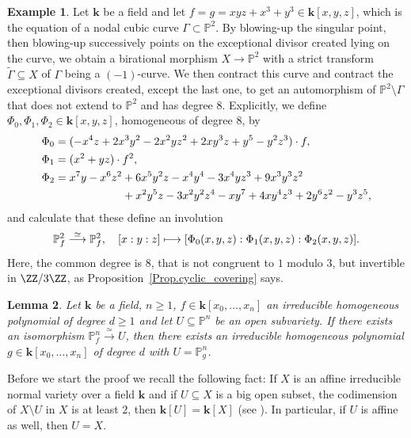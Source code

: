 \documentclass[JEP,XML,SOM,Unicode,NoFloatCountersInSection,published]{cedram}
\newcommand\mto{\mathchoice{\longmapsto}{\mapsto}{\mapsto}{\mapsto}}
\newtheorem{lemma}{Lemma}[section]
\theoremstyle{definition}
\newtheorem{example}[lemma]{Example}
\newcommand\iso{\stackrel{\simeq}{\longrightarrow}}
\renewcommand\k{{\mathbf k}}
\newcommand\p{{\mathbb P}}\let\PP\p
\newcommand{\kk}{\mathbf{k}}
\begin{document}
\begin{example}
Let $\k$ be a field and let $f=g=xyz+x^3+y^3\in \k[x,y,z]$, which is the equation of a nodal cubic curve $\Gamma\subset\p^2$. By blowing-up the singular point, then blowing-up successively points on the exceptional divisor created lying on the curve, we obtain a birational morphism $X\to\p^2$ with a strict transform $\tilde{\Gamma}\subseteq X$
of $\Gamma$ being a $(-1)$-curve. We then contract this curve and contract the exceptional divisors created, except the last one, to get an automorphism of $\p^2\setminus \Gamma$ that does not extend to $\p^2$ and has degree $8$. Explicitly, we define $\Phi_0,\Phi_1,\Phi_2\in \k[x,y,z]$, homogeneous of degree $8$, by
\begin{align*}
\Phi_0 & = (-x^4z + 2x^3y^2 - 2x^2yz^2 + 2xy^3z + y^5 - y^2z^3)\cdot f, \\
\Phi_1 & = (x^2+yz)\cdot f^2, \\
\Phi_2 &=
x^7 y -x^6 z^2+6 x^5 y^2z-x^4 y^4-3 x^4 yz^3 +9 x^3 y^3z^2 \\
&\hspace*{2.14cm} + x^2y^5 z-3 x^2 y^2z^4 - x y^7+4 x y^4z^3 +2 y^6z^2- y^3z^5,
\end{align*}
and calculate that these define an involution
\[
\p^2_f\iso \p^2_f, \quad [x:y:z]\mto [\Phi_0(x,y,z):\Phi_1(x,y,z):\Phi_2(x,y,z)].
\]
Here, the common degree is $8$, that is not congruent to $1$ modulo $3$, but invertible in $\ZZ/3\ZZ$, as Proposition~\ref{Prop.cyclic_covering} says.
\end{example}

\begin{lemma}
\label{Lem.Open_iso_to_Pn_g}
Let $\kk$ be a field, $n\ge 1$, $f \in \kk[x_0, \ldots, x_n]$ an irreducible homogeneous polynomial of degree $d \geq 1$
and let $U \subseteq \p^n$ be an open subvariety.
If there exists an isomorphism $\p^n_f \iso U$, then there exists an irreducible homogeneous polynomial $g \in \kk[x_0, \ldots, x_n]$ of degree $d$ with $U = \p^n_g$.
\end{lemma}

Before we start the proof we recall the following fact: If $X$ is an affine irreducible
normal variety over a field $\kk$ and if $U \subseteq X$ is a big open subset, \ie the codimension of $X \setminus U$ in $X$ is at least $2$,
then $\kk[U] = \kk[X]$ (see \cite[Th.\,11.5]{Ma1986Commutative-ring-t}). In particular, if $U$ is affine as well, then $U = X$.
\end{document}
